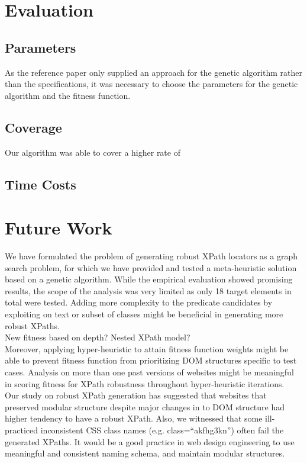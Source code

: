\documentclass[format=acmlarge, nonacm=true]{acmart}
\begin{document}
\section{Evaluation}
\subsection{Parameters}
As the reference paper only supplied an approach for the genetic algorithm rather than the specifications, it was necessary to choose the parameters for the genetic algorithm and the fitness function. 

\subsection{Coverage}
Our algorithm was able to cover a higher rate of 


\subsection{Time Costs}



\section{Future Work}
We have formulated the problem of generating robust XPath locators as a graph search problem, for which we have provided and tested a meta-heuristic solution based on a genetic algorithm. While the empirical evaluation showed promising results, the scope of the analysis was very limited as only 18 target elements in total were tested. Adding more complexity to the predicate candidates by exploiting on text or subset of classes might be beneficial in generating more robust XPaths.\\ 
New fitness based on depth?
Nested XPath model? \\
Moreover, applying hyper-heuristic to attain fitness function weights might be able to prevent fitness function from prioritizing DOM structures specific to test cases. Analysis on more than one past versions of websites might be meaningful in scoring fitness for XPath robustness throughout hyper-heuristic iterations. \\
Our study on robust XPath generation has suggested that websites that preserved modular structure despite major changes in to DOM structure had higher tendency to have a robust XPath. Also, we witnessed that some ill-practiced inconsistent CSS class names (e.g. class=“akfhg3kn”) often fail the generated XPaths. It would be a good practice in web design engineering to use meaningful and consistent naming schema, and maintain modular structures. \\
\end{document}
